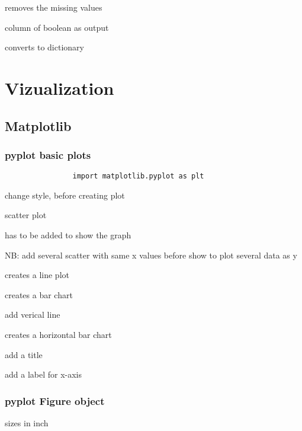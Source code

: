 			 removes the missing values 

			 column of boolean as output


			 converts to dictionary



\section{Vizualization}

	\subsection{Matplotlib}

		\subsubsection{pyplot basic plots}
	
			\begin{lstlisting}
				import matplotlib.pyplot as plt
			\end{lstlisting}

			 change style, before creating plot

			  scatter plot

			 has to be added to show the graph

			NB: add several scatter with same x values before show to plot several data as y

			 creates a line plot

			 creates a bar chart

			 add verical line 

			 creates a horizontal bar chart

			 add a title

			 add a label for x-axis


		\subsubsection{pyplot Figure object}

			 sizes in inch

